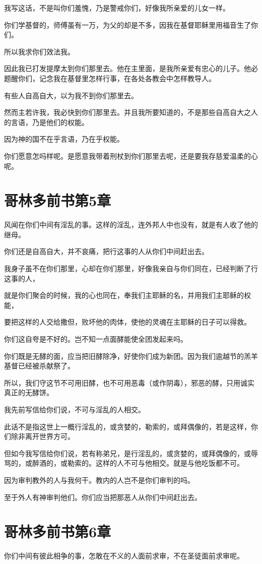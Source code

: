 \documentclass[12pt,oneside]{book}
\begin{document}
我写这话，不是叫你们羞愧，乃是警戒你们，好像我所亲爱的儿女一样。

你们学基督的，师傅虽有一万，为父的却是不多，因我在基督耶稣里用福音生了你们。

所以我求你们效法我。

因此我已打发提摩太到你们那里去。他在主里面，是我所亲爱有忠心的儿子。他必题醒你们，记念我在基督里怎样行事，在各处各教会中怎样教导人。

有些人自高自大，以为我不到你们那里去。

然而主若许我，我必快到你们那里去。并且我所要知道的，不是那些自高自大之人的言语，乃是他们的权能。

因为神的国不在乎言语，乃在乎权能。

你们愿意怎吗样呢。是愿意我带着刑杖到你们那里去呢，还是要我存慈爱温柔的心呢。

\chapter{哥林多前书第5章}
风闻在你们中间有淫乱的事。这样的淫乱，连外邦人中也没有，就是有人收了他的继母。

你们还是自高自大，并不哀痛，把行这事的人从你们中间赶出去。

我身子虽不在你们那里，心却在你们那里，好像我亲自与你们同在，已经判断了行这事的人，

就是你们聚会的时候，我的心也同在，奉我们主耶稣的名，并用我们主耶稣的权能，

要把这样的人交给撒但，败坏他的肉体，使他的灵魂在主耶稣的日子可以得救。

你们这自夸是不好的。岂不知一点面酵能使全团发起来吗。

你们既是无酵的面，应当把旧酵除净，好使你们成为新团。因为我们逾越节的羔羊基督已经被杀献祭了。

所以，我们守这节不可用旧酵，也不可用恶毒（或作阴毒），邪恶的酵，只用诚实真正的无酵饼。

我先前写信给你们说，不可与淫乱的人相交。

此话不是指这世上一概行淫乱的，或贪婪的，勒索的，或拜偶像的，若是这样，你们除非离开世界方可。

但如今我写信给你们说，若有称弟兄，是行淫乱的，或贪婪的，或拜偶像的，或辱骂的，或醉酒的，或勒索的。这样的人不可与他相交。就是与他吃饭都不可。

因为审判教外的人与我何干。教内的人岂不是你们审判的吗。

至于外人有神审判他们。你们应当把那恶人从你们中间赶出去。

\chapter{哥林多前书第6章}
你们中间有彼此相争的事，怎敢在不义的人面前求审，不在圣徒面前求审呢。
\end{document}
